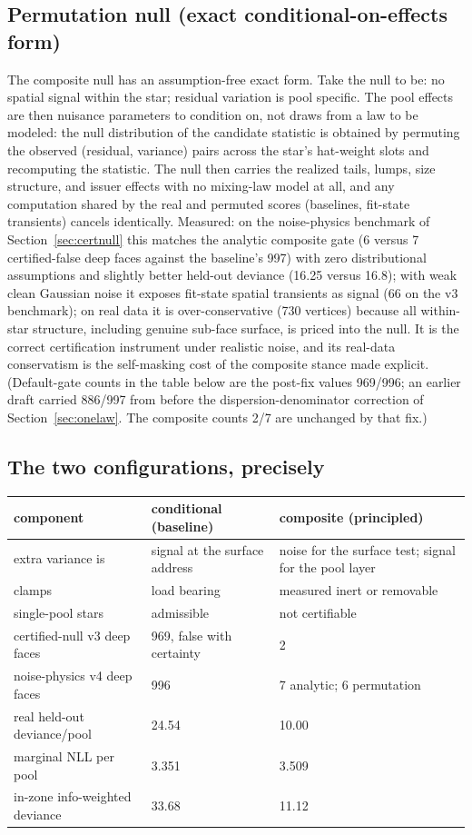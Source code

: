 \documentclass[11pt]{article}
\begin{document}
\subsection{Permutation null (exact conditional-on-effects form)}
The composite null has an assumption-free exact form. Take the null to be:
no spatial signal within the star; residual variation is pool specific.
The pool effects are then nuisance parameters to condition on, not draws
from a law to be modeled: the null distribution of the candidate statistic
is obtained by permuting the observed (residual, variance) pairs across
the star's hat-weight slots and recomputing the statistic. The null then
carries the realized tails, lumps, size structure, and issuer effects with
no mixing-law model at all, and any computation shared by the real and
permuted scores (baselines, fit-state transients) cancels identically.
Measured: on the noise-physics benchmark of Section~\ref{sec:certnull}
this matches the analytic composite gate (6 versus 7 certified-false deep
faces against the baseline's 997) with zero distributional assumptions and
slightly better held-out deviance (16.25 versus 16.8); with weak clean
Gaussian noise it exposes fit-state spatial transients as signal (66 on
the v3 benchmark); on real data it is over-conservative (730 vertices)
because all within-star structure, including genuine sub-face surface, is
priced into the null. It is the correct certification instrument under
realistic noise, and its real-data conservatism is the self-masking cost
of the composite stance made explicit. (Default-gate counts in the table
below are the post-fix values 969/996; an earlier draft carried 886/997
from before the dispersion-denominator correction of
Section~\ref{sec:onelaw}. The composite counts 2/7 are unchanged by that
fix.)

\subsection{The two configurations, precisely}
\begin{center}
\begin{tabular}{p{3.4cm}p{4.6cm}p{5.4cm}}
\toprule
component & conditional (baseline) & composite (principled) \\
\midrule
extra variance is & signal at the surface address & noise for the surface
test; signal for the pool layer \\
clamps & load bearing & measured inert or removable \\
single-pool stars & admissible & not certifiable \\
certified-null v3 deep faces & 969, false with certainty & 2 \\
noise-physics v4 deep faces & 996 & 7 analytic; 6 permutation \\
real held-out deviance/pool & 24.54 & 10.00 \\
marginal NLL per pool & 3.351 & 3.509 \\
in-zone info-weighted deviance & 33.68 & 11.12 \\
\bottomrule
\end{tabular}
\end{center}
\end{document}
